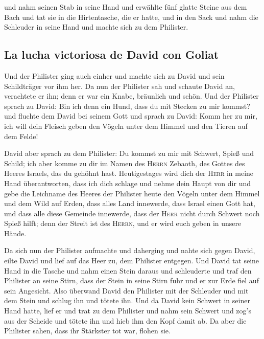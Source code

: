  und nahm seinen Stab in seine Hand und erwählte fünf
glatte Steine aus dem Bach und tat sie in die Hirtentasche, die er
hatte, und in den Sack und nahm die Schleuder in seine Hand und machte
sich zu dem Philister.

\hypertarget{la-lucha-victoriosa-de-david-con-goliat}{%
\subsection{La lucha victoriosa de David con
Goliat}\label{la-lucha-victoriosa-de-david-con-goliat}}

 Und der Philister ging auch einher und machte sich zu
David und sein Schildträger vor ihm her.  Da nun der
Philister sah und schaute David an, verachtete er ihn; denn er war ein
Knabe, bräunlich und schön.  Und der Philister sprach zu
David: Bin ich denn ein Hund, dass du mit Stecken zu mir kommst? und
fluchte dem David bei seinem Gott  und sprach zu David:
Komm her zu mir, ich will dein Fleisch geben den Vögeln unter dem Himmel
und den Tieren auf dem Felde!

 David aber sprach zu dem Philister: Du kommst zu mir mit
Schwert, Spieß und Schild; ich aber komme zu dir im Namen des
\textsc{Herrn} Zebaoth, des Gottes des Heeres Israels, das du gehöhnt
hast.  Heutigestages wird dich der \textsc{Herr} in meine
Hand überantworten, dass ich dich schlage und nehme dein Haupt von dir
und gebe die Leichname des Heeres der Philister heute den Vögeln unter
dem Himmel und dem Wild auf Erden, dass alles Land innewerde, dass
Israel einen Gott hat,  und dass alle diese Gemeinde
innewerde, dass der \textsc{Herr} nicht durch Schwert noch Spieß hilft;
denn der Streit ist des \textsc{Herrn}, und er wird euch geben in unsere
Hände.

 Da sich nun der Philister aufmachte und daherging und
nahte sich gegen David, eilte David und lief auf das Heer zu, dem
Philister entgegen.  Und David tat seine Hand in die
Tasche und nahm einen Stein daraus und schleuderte und traf den
Philister an seine Stirn, dass der Stein in seine Stirn fuhr und er zur
Erde fiel auf sein Angesicht.  Also überwand David den
Philister mit der Schleuder und mit dem Stein und schlug ihn und tötete
ihn. Und da David kein Schwert in seiner Hand hatte, 
lief er und trat zu dem Philister und nahm sein Schwert und zog's aus
der Scheide und tötete ihn und hieb ihm den Kopf damit ab. Da aber die
Philister sahen, dass ihr Stärkster tot war, flohen sie.

